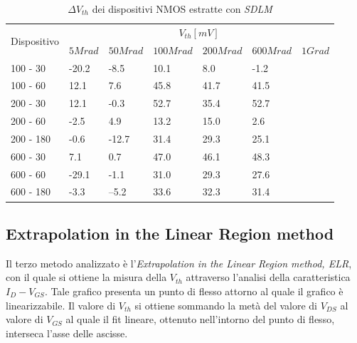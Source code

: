\documentclass[12pt, letterpaper]{book}
\begin{document}
\begin{table}[H]
  \renewcommand{\arraystretch}{1.3}
    \begin{tabular}{m{2cm}  m{1.1cm} m{1.3cm} m{1.5cm} m{1.5cm} m{1.5cm} m{1cm}}
      \toprule
      \multirow{2}{*}{Dispositivo} & \multicolumn{6}{c}{$V_{th} [mV] $}                                                                    \\
      \cmidrule{2-7}
                                   & $5Mrad$		& $50Mrad$& $100Mrad$ & $200Mrad$ & $600Mrad$ & $1Grad$ \\
      \midrule
      100 - 30               	& -20.2		& -8.5		& 10.1		& 8.0		& -1.2		&    \\
      \hline
      100 - 60                 	& 12.1		& 7.6		& 45.8		& 41.7		& 41.5		&    \\
      \hline
      200 - 30                  	& 12.1		& -0.3		& 52.7		& 35.4		&52.7 		&    \\
      \hline
      200 - 60                    & -2.5		& 4.9		& 13.2		& 15.0		& 2.6		&   \\
      \hline
      200 - 180 			& -0.6		& -12.7 		& 31.4		& 29.3		& 25.1		&    \\
      \hline
      600 - 30                  	& 7.1		& 0.7		& 47.0		& 46.1		& 48.3		&    \\
      \hline
      600 - 60                    & -29.1  		& -1.1		& 31.0		& 29.3		& 27.6		&   \\
      \hline
      600 - 180              	& -3.3 		& --5.2		& 33.6		& 32.3		& 31.4		&  \\
      \bottomrule
    \end{tabular}
  \caption{$\Delta V_{th}$ dei dispositivi NMOS estratte con \emph{SDLM}}
  \label{tab:deltaVthSDLMN}
\end{table}








\subsection{Extrapolation in the Linear Region method}


Il terzo metodo analizzato è l'\emph{Extrapolation in the Linear Region method, ELR}, con il quale si ottiene la misura della $V_{th}$ attraverso l'analisi della caratteristica $I_D-V_{GS}$.  Tale grafico presenta un punto di flesso attorno al quale il grafico è linearizzabile. Il valore di $V_{th}$ si ottiene sommando la metà del valore di $V_{DS}$ al valore di $V_{GS}$ al quale il fit lineare, ottenuto nell'intorno del punto di flesso, interseca l'asse delle ascisse.\\
\end{document}
